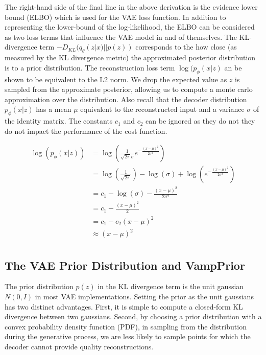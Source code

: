 \documentclass[./dissertation.tex]{subfiles}
\begin{document}
    The right-hand side of the final line in the above derivation is the evidence lower bound (ELBO) which is used for the VAE loss function. In addition to representing the lower-bound of the log-likelihood, the ELBO can be considered as two loss terms that influence the VAE model in and of themselves. The KL-divergence term $-D_{KL}(q_{\theta}(z|x)||p(z))$ corresponds to the how close (as measured by the KL divergence metric) the approximated posterior distribution is to a prior distribution. The reconstruction loss term $\log(p_{\phi}(x|z)$ an be shown to be equivalent to the L2 norm. We drop the expected value as $z$ is sampled from the approximate posterior, allowing us to compute a monte carlo approximation over the distribution. Also recall that the decoder distribution $p_{\phi}(x|z) $ has a mean $\mu$ equivalent to the reconstructed input and a variance $\sigma$ of the identity matrix. The constants $c_{1}$ and $c_{2}$ can be ignored as they do not they do not impact the performance of the cost function. 
    
    \begin{equation*}
    \begin{aligned}
    \log(p_{\phi}(x|z)) &= \log(\frac{1}{\sqrt{2\pi}\sigma}e^{{-\frac{(x - \mu)^{2}}{2\sigma^{2}}}}) \\
    &= \log(\frac{1}{\sqrt{2\pi}}) - \log(\sigma) + \log(e^{{-\frac{(x - \mu)^{2}}{2\sigma^{2}}}}) \\
    &= c_{1} - \log(\sigma) - \frac{(x - \mu)^{2}}{2\sigma^{2}} \\
    &= c_{1} - \frac{(x - \mu)^{2}}{2} \\
    &= c_{1} - c_{2}(x - \mu)^{2} \\
    &\approx (x - \mu)^{2} \\
    \end{aligned}
    \end{equation*}
    
    \subsection{The VAE Prior Distribution and VampPrior}
    The prior distribution $p(z)$ in the KL divergence term is the unit gaussian $N(0, I)$ in most VAE implementations. Setting the prior as the unit gaussians has two distinct advantages. First, it is simple to compute a closed-form KL divergence between two gaussians. Second, by choosing a prior distribution with a convex probability density function (PDF), in sampling from the distribution during the generative process, we are less likely to sample points for which the decoder cannot provide quality reconstructions. \\
    
\end{document}
